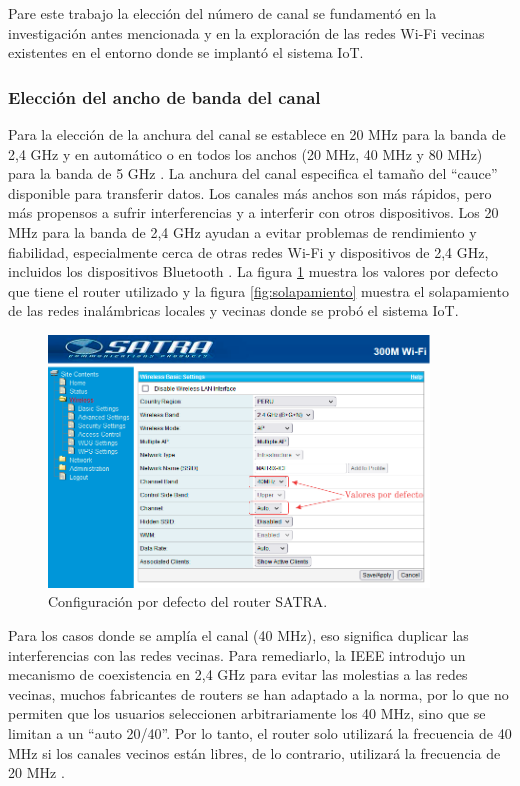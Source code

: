 Pare este trabajo la elección del número de canal se fundamentó en la investigación antes mencionada y en la exploración de las redes Wi-Fi vecinas existentes en el entorno donde se implantó el sistema IoT.

\subsubsection{Elección del ancho de banda del canal}

Para la elección de la anchura del canal se establece en 20 MHz para la banda de 2,4 GHz y en automático o en todos los anchos (20 MHz, 40 MHz y 80 MHz) para la banda de 5 GHz \citep{WEBSITE:29}. La anchura del canal especifica el tamaño del ``cauce'' disponible para transferir datos. Los canales más anchos son más rápidos, pero más propensos a sufrir interferencias y a interferir con otros dispositivos. Los 20 MHz para la banda de 2,4 GHz ayudan a evitar problemas de rendimiento y fiabilidad, especialmente cerca de otras redes Wi-Fi y dispositivos de 2,4 GHz, incluidos los dispositivos Bluetooth \citep{WEBSITE:29}. La figura \ref{fig:configuracioncanal} muestra los valores por defecto que tiene el router utilizado y la figura \ref{fig:solapamiento} muestra el solapamiento de las redes inalámbricas locales y vecinas donde se probó el sistema IoT.

\begin{figure}[htpb]
\centering 
\includegraphics[width=0.9\textwidth]{./Figures/configuracioncanal.png}
\caption{Configuración por defecto del router SATRA.}
\label{fig:configuracioncanal}
\end{figure}

Para los casos donde se amplía el canal (40 MHz), eso significa duplicar las interferencias con las redes vecinas. Para remediarlo, la IEEE introdujo un mecanismo de coexistencia en 2,4 GHz para evitar las molestias a las redes vecinas, muchos fabricantes de routers se han adaptado a la norma, por lo que no permiten que los usuarios seleccionen arbitrariamente los 40 MHz, sino que se limitan a un ``auto 20/40''. Por lo tanto, el router solo utilizará la frecuencia de 40 MHz si los canales vecinos están libres, de lo contrario, utilizará la frecuencia de 20 MHz \citep{WEBSITE:30}.

